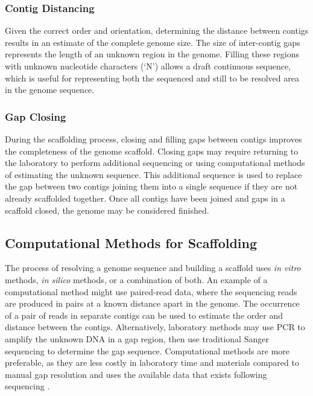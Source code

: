 \documentclass[10pt]{bmc_article}
\newenvironment{bmcformat}{\begin{raggedright}\baselineskip20pt\sloppy\setboolean{publ}{false}}{\end{raggedright}\baselineskip20pt\sloppy}
\begin{document}
\begin{bmcformat}
\subsubsection*{Contig Distancing} %

Given the correct order and orientation, determining the distance between
contigs results in an estimate of the complete genome size. The size of
inter-contig gaps represents the length of an unknown region in the genome.
Filling these regions with unknown nucleotide characters (`N') allows a draft
continuous sequence, which is useful for representing both the sequenced and
still to be resolved area in the genome sequence.

\subsubsection*{Gap Closing} %

During the scaffolding process, closing and filling gaps between contigs
improves the completeness of the genome scaffold. Closing gaps may require
returning to the laboratory to perform additional sequencing or using
computational methods of estimating the unknown sequence. This additional
sequence is used to replace the gap between two contigs joining them into
a single sequence if they are not already scaffolded together. Once all contigs
have been joined and gaps in a scaffold closed, the genome may be considered
finished.

\subsection*{Computational Methods for Scaffolding} %

The process of resolving a genome sequence and building a scaffold uses
\emph{in vitro} methods, \emph{in silico} methods, or a combination of both. An
example of a computational method might use paired-read data, where the
sequencing reads are produced in pairs at a known distance apart in the genome.
The occurrence of a pair of reads in separate contigs can be used to estimate
the order and distance between the contigs. Alternatively, laboratory methods
may use PCR to amplify the unknown DNA in a gap region, then use traditional
Sanger sequencing to determine the gap sequence. Computational methods are more
preferable, as they are less costly in laboratory time and materials compared
to manual gap resolution and uses the available data that exists following
sequencing \cite{nagarajan2010}. \pb


\end{bmcformat}
\end{document}
